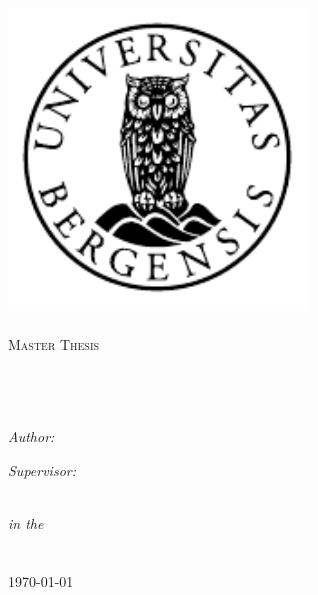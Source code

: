 \documentclass[11pt, a4paper, oneside]{Thesis} %
\begin{document}
\begin{titlepage}
\begin{center}
\includegraphics[width=8cm]{Figures/uib-emblem-svart} \\[0.5cm]
\textsc{\LARGE \univname}\\[1.5cm] %
\textsc{\Large Master Thesis}\\[0.5cm] %

\HRule \\[0.4cm] %
{\huge \bfseries \ttitle}\\[0.4cm] %
\HRule \\[1.5cm] %

\begin{minipage}{0.4\textwidth}
\begin{flushleft} \large
\emph{Author:}\\
\href{http://blog.elseth.me}{\authornames} %
\end{flushleft}
\end{minipage}
\begin{minipage}{0.4\textwidth}
\begin{flushright} \large
\emph{Supervisor:} \\
{\supname} %
\end{flushright}
\end{minipage}\\[2cm]

\textit{in the}\\[0.1cm]
\groupname\\\deptname\\[0.5cm] %

{\large \today}\\[1cm] %
\end{center}

\end{titlepage}
\end{document}

